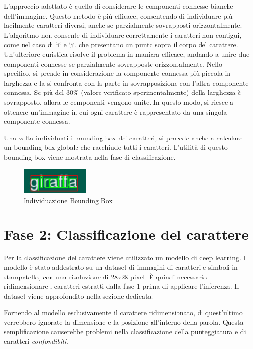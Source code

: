 L'approccio adottato è quello di considerare le componenti connesse bianche dell'immagine. Questo metodo è più efficace, consentendo di individuare più facilmente caratteri diversi, anche se parzialmente sovrapposti orizzontalmente. L'algoritmo non consente di individuare correttamente i caratteri non contigui, come nel caso di `i` e `j`, che presentano un punto sopra il corpo del carattere. Un'ulteriore euristica risolve il problema in maniera efficace, andando a unire due componenti connesse se parzialmente sovrapposte orizzontalmente. Nello specifico, si prende in considerazione la componente connessa più piccola in larghezza e la si confronta con la parte in sovrapposizione con l'altra componente connessa. Se più del 30\% (valore verificato sperimentalmente) della larghezza è sovrapposto, allora le componenti vengono unite. In questo modo, si riesce a ottenere un'immagine in cui ogni carattere è rappresentato da una singola componente connessa.
\newline

Una volta individuati i bounding box dei caratteri, si procede anche a calcolare un bounding box globale che racchiude tutti i caratteri. L'utilità di questo bounding box viene mostrata nella fase di classificazione.

\begin{figure}[H]
	\centering
	\includegraphics[width=0.3\textwidth]{images/giraffa-bb.jpeg}
	\caption{Individuazione Bounding Box}
	\label{fig:screenshot}
\end{figure}

\section{Fase 2: Classificazione del carattere}

Per la classificazione del carattere viene utilizzato un modello di deep learning. Il modello è stato addestrato su un dataset di immagini di caratteri e simboli in stampatello, con una risoluzione di 28x28 pixel. È quindi necessario ridimensionare i caratteri estratti dalla fase 1 prima di applicare l'inferenza. Il dataset viene approfondito nella sezione dedicata.

Fornendo al modello esclusivamente il carattere ridimensionato, di quest'ultimo verrebbero ignorate la dimensione e la posizione all'interno della parola. Questa semplificazione causerebbe problemi nella classificazione della punteggiatura e di caratteri \emph{confondibili}.

